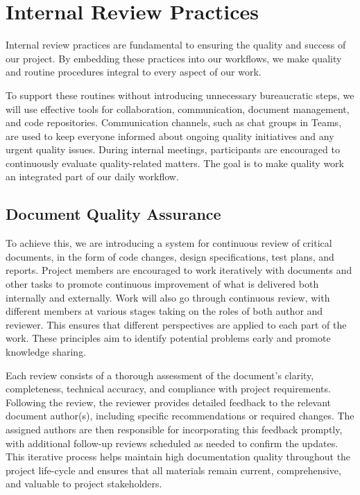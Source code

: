 \documentclass{article}
\begin{document}
\newpage
\section{Internal Review Practices}
Internal review practices are fundamental to ensuring the quality and success of our project. By embedding these practices into our workflows, we make quality and routine procedures integral to every aspect of our work.

To support these routines without introducing unnecessary bureaucratic steps, we will use effective tools for collaboration, communication, document management, and code repositories. Communication channels, such as chat groups in Teams, are used to keep everyone informed about ongoing quality initiatives and any urgent quality issues. During internal meetings, participants are encouraged to continuously evaluate quality-related matters. The goal is to make quality work an integrated part of our daily workflow.

\subsection{Document Quality Assurance}
\label{document_review}
To achieve this, we are introducing a system for continuous review of critical documents, in the form of code changes, design specifications, test plans, and reports. Project members are encouraged to work iteratively with documents and other tasks to promote continuous improvement of what is delivered both internally and externally. Work will also go through continuous review, with different members at various stages taking on the roles of both author and reviewer. This ensures that different perspectives are applied to each part of the work. These principles aim to identify potential problems early and promote knowledge sharing.

Each review consists of a thorough assessment of the document's clarity, completeness, technical accuracy, and compliance with project requirements. Following the review, the reviewer provides detailed feedback to the relevant document author(s), including specific recommendations or required changes. The assigned authors are then responsible for incorporating this feedback promptly, with additional follow-up reviews scheduled as needed to confirm the updates. This iterative process helps maintain high documentation quality throughout the project life-cycle and ensures that all materials remain current, comprehensive, and valuable to project stakeholders. 
\end{document}
